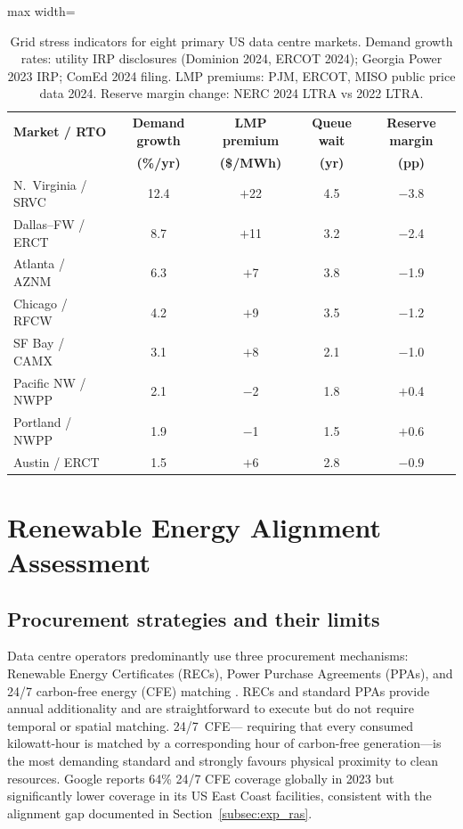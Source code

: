 \documentclass[preprint,12pt]{elsarticle}
\begin{document}
\begin{table}[htbp]
\centering
\caption{Grid stress indicators for eight primary US data centre markets.
Demand growth rates: utility IRP disclosures (Dominion 2024, ERCOT 2024);
Georgia Power 2023 IRP; ComEd 2024 filing. LMP premiums: PJM, ERCOT, MISO public
price data 2024. Reserve margin change: NERC 2024 LTRA vs 2022 LTRA.}
\label{tab:grid_stress}
\small
\begin{adjustbox}{max width=\linewidth}
\begin{tabular}{@{}p{2.8cm}cccc@{}}
\toprule
\textbf{Market / RTO} & \textbf{Demand growth} &
\textbf{LMP premium} & \textbf{Queue wait} &
\textbf{Reserve margin} \\
& \textbf{(\%/yr)} & \textbf{(\$/MWh)} & \textbf{(yr)} &
\textbf{(pp)} \\
\midrule
N.\ Virginia / SRVC & 12.4 & $+$22 & 4.5 & $-$3.8 \\
Dallas--FW / ERCT & 8.7  & $+$11 & 3.2 & $-$2.4 \\
Atlanta / AZNM     & 6.3  & $+$7  & 3.8 & $-$1.9 \\
Chicago / RFCW      & 4.2  & $+$9  & 3.5 & $-$1.2 \\
SF Bay / CAMX  & 3.1  & $+$8  & 2.1 & $-$1.0 \\
Pacific NW / NWPP  & 2.1  & $-$2  & 1.8 & $+$0.4 \\
Portland / NWPP    & 1.9  & $-$1  & 1.5 & $+$0.6 \\
Austin / ERCT      & 1.5  & $+$6  & 2.8 & $-$0.9 \\
\bottomrule
\end{tabular}
\end{adjustbox}
\end{table}

\section{Renewable Energy Alignment Assessment}
\label{sec:renewable}

\subsection{Procurement strategies and their limits}
\label{subsec:procurement}

Data centre operators predominantly use three procurement mechanisms:
Renewable Energy Certificates (RECs), Power Purchase Agreements (PPAs),
and 24/7 carbon-free energy (CFE) matching \cite{energytag2022}. RECs
and standard PPAs provide annual additionality and are straightforward to
execute but do not require temporal or spatial matching. 24/7~CFE---
requiring that every consumed kilowatt-hour is matched by a corresponding
hour of carbon-free generation---is the most demanding standard and strongly
favours physical proximity to clean resources. Google reports 64\% 24/7 CFE
coverage globally in 2023 but significantly lower coverage in its
US East Coast facilities, consistent with the alignment gap documented in
Section~\ref{subsec:exp_ras}.
\end{document}
